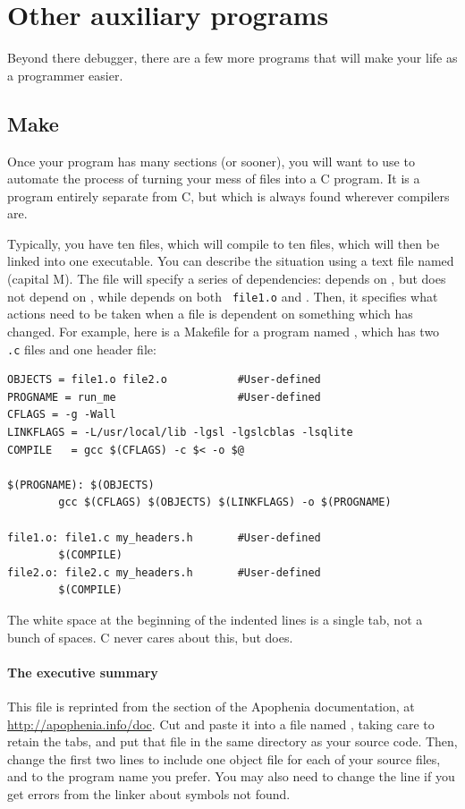 \documentclass[12pt]{article}
\begin{document}
\section{Other auxiliary programs} Beyond there debugger, there
are a few more programs that will make your life as a programmer easier.

\subsection{Make} \label{make} 
Once your program has many sections (or sooner), you will want to use
 to automate the process of turning your mess of files into
a C program.  It is a program entirely separate from C, but which
is always found wherever compilers are.

Typically, you have ten  files, which will compile
to ten  files, which will then be linked into one executable.
You can describe the situation using a
text file named  (capital M). The file will specify a
series of dependencies:  depends on , but does
not depend on , while  depends on both {\tt
file1.o} and .  Then, it specifies what actions need to be taken
when a file is dependent on something which has changed.  For example,
here is a Makefile for a program named , which has two {\tt
.c} files and one header file:

\begin{verbatim}
OBJECTS = file1.o file2.o           #User-defined
PROGNAME = run_me                   #User-defined
CFLAGS = -g -Wall
LINKFLAGS = -L/usr/local/lib -lgsl -lgslcblas -lsqlite
COMPILE   = gcc $(CFLAGS) -c $< -o $@

$(PROGNAME): $(OBJECTS)
        gcc $(CFLAGS) $(OBJECTS) $(LINKFLAGS) -o $(PROGNAME)

file1.o: file1.c my_headers.h       #User-defined
        $(COMPILE)
file2.o: file2.c my_headers.h       #User-defined
        $(COMPILE)
\end{verbatim}

The white space at the beginning of the indented lines is a single tab,
not a bunch of spaces.  C never cares about this, but 
does.

\paragraph{The executive summary} This file is reprinted from the 
section of the Apophenia documentation, at
\url{http://apophenia.info/doc}. Cut and paste it into a file named
, taking care to retain the tabs, and put that file in
the same directory as your source code. Then, change the first two lines
to include one object file for each of your source files, and
to the program name you prefer.  You may also need to change the
 line if you get errors from the linker about symbols
not found.
\end{document}
